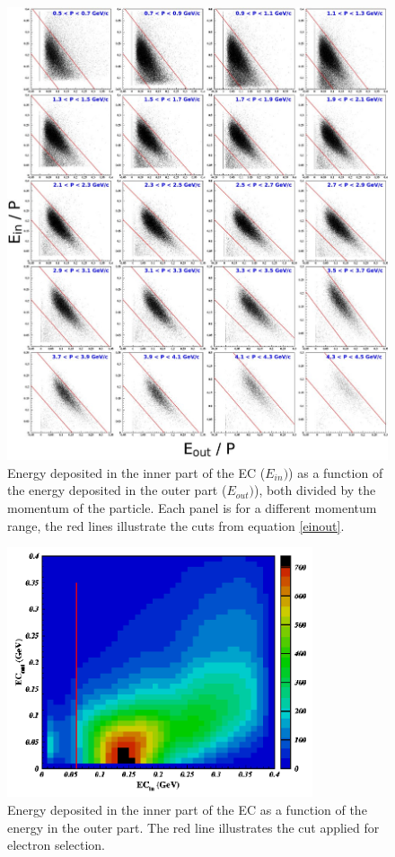 \begin{figure}[p]
\centering
\includegraphics[width=14cm] {chap5-fig/fig02.jpg} 
\caption {Energy deposited in the inner part of the EC ($E_{in})$) as a function of the 
energy deposited in the outer part ($E_{out})$), both divided by the momentum of the 
particle. Each panel is for a different momentum range, the red lines 
illustrate the cuts from equation \ref{einout}.}
\label{eleEC}
\end{figure}

\begin{figure}[tbp]
\centering
\includegraphics[width=9cm] {chap5-fig/fig03.png} 
\caption {Energy deposited in the inner part of the EC as a function of the 
energy in the outer part. The red line illustrates the cut applied for 
electron selection.}
\label{eleECi}
\end{figure}

